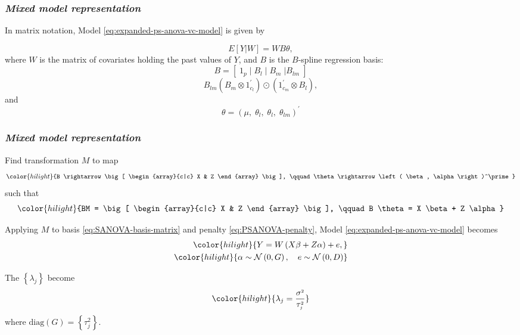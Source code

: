 \documentclass[12pt]{beamer}
\newcommand{\ms}{\scriptscriptstyle}
\newcommand{\newmaththought}[1]{{ \color{hilight} {#1}}}
\begin{document}
\begin{frame}
\frametitle{\emph{Mixed model representation}}


In matrix notation, Model \ref{eq:expanded-ps-anova-vc-model} is given by

\begin{equation*}  
E \left[ Y | W \right] = WB \theta,
\end{equation*}
\noindent
where $W$ is the matrix of covariates holding the past values of $Y$, and $B$ is the $B$-spline regression basis:
\begin{equation} \label{eq:SANOVA-basis-matrix}
B = \left[\; 1_p \; \vert \;  B_l  \; \vert \;   B_m \; \vert B_{lm} \; \right]
\end{equation}
\noindent
\begin{equation*} \label{eq:rowwise-kronecker-product}
B_{lm} \left( B_m \otimes 1^\prime_{c_l} \right) \odot \left(1^\prime_{c_m} \otimes  B_l  \right),
\end{equation*}
\noindent
and
\begin{equation*} 
\theta = \left(\mu, \;\theta_{\ms l}, \;\theta_{\ms l}, \;\theta_{\ms{lm}} \right)^\prime
\end{equation*}
\end{frame}





\begin{frame}
\frametitle{\emph{Mixed model representation}}

Find transformation $M$ to map
\begin{equation*}
\newmaththought{B \rightarrow \big[ \begin{array}{c|c} X & Z \end{array}  \big], \qquad \theta \rightarrow \left( \beta, \alpha \right)^\prime}
\end{equation*}
\noindent
such that 
\begin{equation*}
\newmaththought{BM = \big[ \begin{array}{c|c} X & Z \end{array}  \big], \qquad B \theta = X \beta + Z \alpha}
\end{equation*}


Applying $M$ to basis \ref{eq:SANOVA-basis-matrix} and penalty \ref{eq:PSANOVA-penalty}, Model \ref{eq:expanded-ps-anova-vc-model} becomes
\begin{align} 
\begin{split} \label{eq:vc-mixed-effects-model}
\newmaththought{Y = W\left(X \beta + Z \alpha\right) + e, }\\
\newmaththought{ \alpha \sim \mathcal{N}\left(0,G \right), \quad e\sim\mathcal{N}\left(0, D \right)}
\end{split}
\end{align} 

\noindent
The $\left\{ \lambda_j \right \}$ become
\[
\newmaththought{\lambda_j  = \frac{\sigma^{\ms 2} }{\tau_{\ms j}^{\ms 2}}}
\]
where $\mbox{diag}\left(G\right) = \left\{ \tau_{\ms j}^{\ms 2} \right\}$. 
\end{frame}
\end{document}
